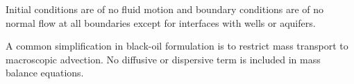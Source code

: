 \documentclass[authoryear,preprint,review,11pt]{elsarticle}
\begin{document}
Initial conditions are of no fluid motion and boundary conditions are of no normal flow at all boundaries except for interfaces with wells or aquifers.

A common simplification in black-oil formulation is to restrict mass transport to macroscopic advection. No diffusive or dispersive term is included in mass balance equations. 


\end{document}
